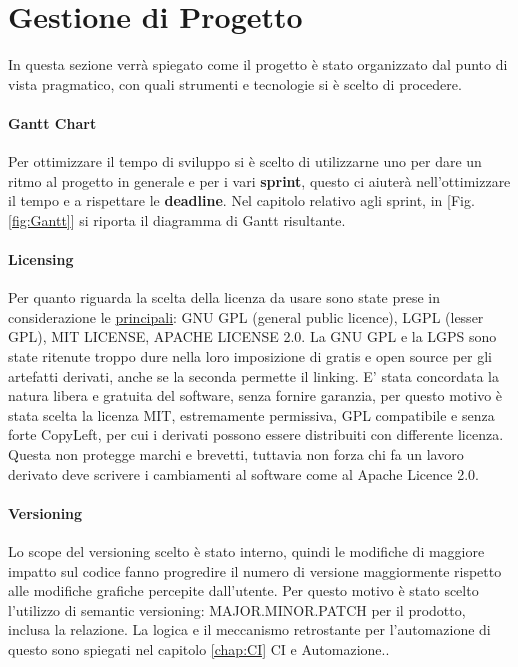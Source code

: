     
    
    

\section{Gestione di Progetto}
In questa sezione verrà spiegato come il progetto è stato organizzato dal punto di vista pragmatico, con quali strumenti e tecnologie si è scelto di procedere.
    \paragraph{Gantt Chart} Per ottimizzare il tempo di sviluppo si è scelto di utilizzarne uno per dare un ritmo al progetto in generale e per i vari \textbf{sprint}, questo ci aiuterà nell'ottimizzare il tempo e a rispettare le \textbf{deadline}. Nel capitolo relativo agli sprint, in [Fig. \ref{fig:Gantt}]  si riporta il diagramma di Gantt risultante. 
    
    \paragraph{Licensing} Per quanto riguarda la scelta della licenza da usare sono state prese in considerazione le \href{https://choosealicense.com/licenses/}{principali}: GNU GPL (general public licence), LGPL (lesser GPL), MIT LICENSE, APACHE LICENSE 2.0. La GNU GPL e la LGPS sono state ritenute troppo dure nella loro imposizione di gratis e open source per gli artefatti derivati, anche se la seconda permette il linking. E' stata concordata la natura libera e gratuita del software, senza fornire garanzia, per questo motivo è stata scelta la licenza MIT, estremamente permissiva, GPL compatibile e senza forte CopyLeft, per cui i derivati possono essere distribuiti con differente licenza. Questa non protegge marchi e brevetti, tuttavia non forza chi fa un lavoro derivato deve scrivere i cambiamenti al software come al Apache Licence 2.0.
    
    \paragraph{Versioning}
    Lo scope del versioning scelto è stato interno, quindi le modifiche di maggiore impatto sul codice fanno progredire il numero di versione maggiormente rispetto alle modifiche grafiche percepite dall'utente. Per questo motivo è stato scelto l'utilizzo di semantic versioning: MAJOR.MINOR.PATCH per il prodotto, inclusa la relazione. La logica e il meccanismo retrostante per l'automazione di questo sono spiegati nel capitolo \ref{chap:CI} CI e Automazione..
    
